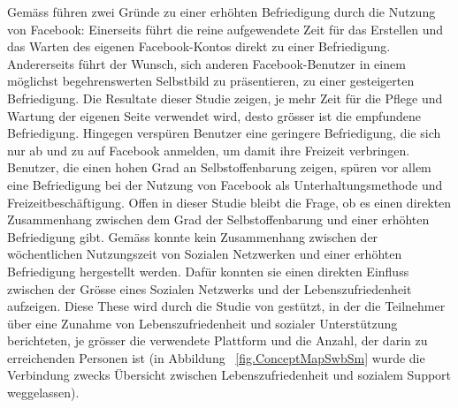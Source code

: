 Gemäss  führen zwei Gründe zu einer erhöhten Befriedigung durch die Nutzung von Facebook: Einerseits führt die reine aufgewendete Zeit für das Erstellen und das Warten des eigenen Facebook-Kontos direkt zu einer Befriedigung. Andererseits führt der Wunsch, sich anderen Facebook-Benutzer in einem möglichst begehrenswerten Selbstbild zu präsentieren, zu einer gesteigerten Befriedigung. Die Resultate dieser Studie zeigen, je mehr Zeit für die Pflege und Wartung der eigenen Seite verwendet wird, desto grösser ist die empfundene Befriedigung. Hingegen verspüren Benutzer eine geringere Befriedigung, die sich nur ab und zu auf Facebook anmelden, um damit ihre Freizeit verbringen. \newline
Benutzer, die einen hohen Grad an Selbstoffenbarung zeigen, spüren vor allem eine Befriedigung bei der Nutzung von Facebook als Unterhaltungsmethode und Freizeitbeschäftigung. Offen in dieser Studie bleibt die Frage, ob es einen direkten Zusammenhang zwischen dem Grad der Selbstoffenbarung und einer erhöhten Befriedigung gibt.\newline
Gemäss  konnte kein Zusammenhang zwischen der wöchentlichen Nutzungszeit von Sozialen Netzwerken und einer erhöhten Befriedigung hergestellt werden. Dafür konnten sie einen direkten Einfluss zwischen der Grösse eines Sozialen Netzwerks und der Lebenszufriedenheit aufzeigen. Diese These wird durch die Studie von  gestützt, in der die Teilnehmer über eine Zunahme von Lebenszufriedenheit und sozialer Unterstützung berichteten, je grösser die verwendete Plattform und die Anzahl, der darin zu erreichenden Personen ist (in Abbildung ~\ref{fig.ConceptMapSwbSm} wurde die Verbindung zwecks Übersicht zwischen Lebenszufriedenheit und sozialem Support weggelassen). 

